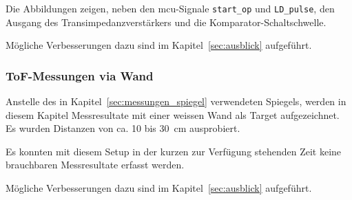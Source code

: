 Die Abbildungen zeigen, neben den \acrshort{mcu}-Signale \lstinline|start_op| und \lstinline|LD_pulse|, den Ausgang
des Transimpedanzverstärkers und die Komparator-Schaltschwelle.

Mögliche Verbesserungen dazu sind im Kapitel~\ref{sec:ausblick} aufgeführt. %

\subsubsection{ToF-Messungen via Wand}\label{sec:messungen_wand}

Anstelle des in Kapitel~\ref{sec:messungen_spiegel} verwendeten Spiegels, werden in diesem Kapitel Messresultate mit
einer weissen Wand als Target aufgezeichnet. Es wurden Distanzen von ca. 10 bis 30~cm ausprobiert.

Es konnten mit diesem Setup in der kurzen zur Verfügung stehenden Zeit keine brauchbaren Messresultate erfasst werden.

Mögliche Verbesserungen dazu sind im Kapitel~\ref{sec:ausblick} aufgeführt. %
